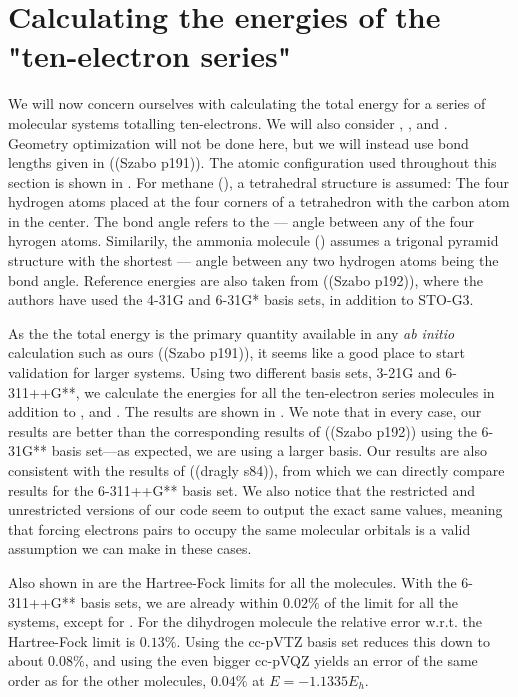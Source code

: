 \documentclass[../../master.tex]{subfiles}
\begin{document}
\section{Calculating the energies of the "ten-electron series"}
We will now concern ourselves with calculating the total energy for a series of molecular systems totalling ten-electrons. We will also consider , , and . Geometry optimization will not be done here, but we will instead use bond lengths given in ((Szabo p191)). The atomic configuration used throughout this section is shown in . For methane (), a tetrahedral structure is assumed: The four hydrogen atoms placed at the four corners of a tetrahedron with the carbon atom in the center. The bond angle refers to the \---\--- angle between any of the four hyrogen atoms. Similarily, the ammonia molecule () assumes a trigonal pyramid structure with the shortest \---\--- angle between any two hydrogen atoms being the bond angle. Reference energies are also taken from ((Szabo p192)), where the authors have used the 4-31G and 6-31G* basis sets, in addition to STO-G3. 

As the the total energy is the primary quantity available in any \emph{ab initio} calculation such as ours ((Szabo p191)), it seems like a good place to start validation for larger systems. Using two different basis sets, 3-21G and 6-311++G**, we calculate the energies for all the ten-electron series molecules in addition to ,  and . The results are shown in . We note that in every case, our results are better than the corresponding results of ((Szabo p192)) using the 6-31G** basis set\----as expected, we are using a larger basis. Our results are also consistent with the results of ((dragly s84)), from which we can directly compare results for the 6-311++G** basis set. We also notice that the restricted and unrestricted versions of our code seem to output the exact same values, meaning that forcing electrons pairs to occupy the same molecular orbitals is a valid assumption we can make in these cases.

Also shown in  are the Hartree-Fock limits for all the molecules. With the 6-311++G** basis sets, we are already within $0.02\%$ of the limit for all the systems, except for . For the dihydrogen molecule the relative error w.r.t. the Hartree-Fock limit is $0.13\%$. Using the cc-pVTZ basis set reduces this down to about $0.08\%$, and using the even bigger cc-pVQZ yields an error of the same order as for the other molecules, $0.04\%$ at $E=-1.1335E_h$.
\end{document}
